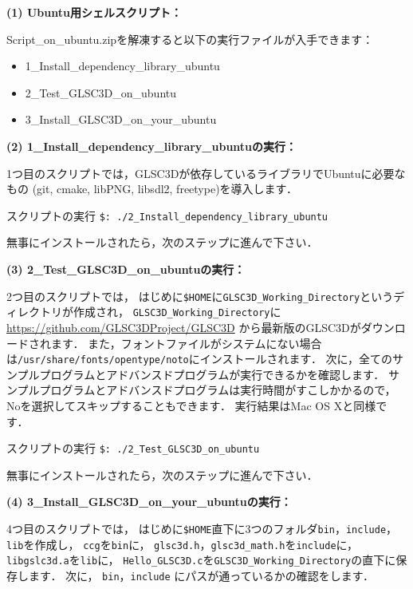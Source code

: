 \documentclass[platex,a4paper,12pt]{jsarticle}%
\begin{document}
\noindent 
{\bf (1) Ubuntu用シェルスクリプト：} 

Script\_on\_ubuntu.zipを解凍すると以下の実行ファイルが入手できます：
\begin{itemize}
\item[] 1\_Install\_dependency\_library\_ubuntu
\item[] 2\_Test\_GLSC3D\_on\_ubuntu
\item[] 3\_Install\_GLSC3D\_on\_your\_ubuntu
\end{itemize}

\noindent 
{\bf (2) 1\_Install\_dependency\_library\_ubuntuの実行：} 

1つ目のスクリプトでは，GLSC3Dが依存しているライブラリでUbuntuに必要なもの
(git, cmake, libPNG, libsdl2, freetype)を導入します．

\begin{itembox}[l]{スクリプトの実行}
\verb|$: ./2_Install_dependency_library_ubuntu|
\end{itembox}

無事にインストールされたら，次のステップに進んで下さい．

\noindent 
{\bf (3) 2\_Test\_GLSC3D\_on\_ubuntuの実行：} 

2つ目のスクリプトでは，
はじめに\verb|$HOME|に\verb|GLSC3D_Working_Directory|というディレクトリが作成され，
\verb|GLSC3D_Working_Directory|に
\url{https://github.com/GLSC3DProject/GLSC3D}
から最新版のGLSC3Dがダウンロードされます．
また，フォントファイルがシステムにない場合は\verb|/usr/share/fonts/opentype/noto|にインストールされます．
次に，全てのサンプルプログラムとアドバンスドプログラムが実行できるかを確認します．
サンプルプログラムとアドバンスドプログラムは実行時間がすこしかかるので，Noを選択してスキップすることもできます．
実行結果はMac OS Xと同様です．

\begin{itembox}[l]{スクリプトの実行}
\verb|$: ./2_Test_GLSC3D_on_ubuntu|
\end{itembox}

無事にインストールされたら，次のステップに進んで下さい．

\noindent 
{\bf (4) 3\_Install\_GLSC3D\_on\_your\_ubuntuの実行：} 

4つ目のスクリプトでは，
はじめに\verb|$HOME|直下に3つのフォルダ\verb|bin|，\verb|include|，\verb|lib|を作成し，
\verb|ccg|を\verb|bin|に，
\verb|glsc3d.h|，\verb|glsc3d_math.h|を\verb|include|に，
\verb|libgslc3d.a|を\verb|lib|に，
\verb|Hello_GLSC3D.c|を\verb|GLSC3D_Working_Directory|の直下に保存します．
次に，
\verb|bin|，\verb|include|
にパスが通っているかの確認をします．
\end{document}
